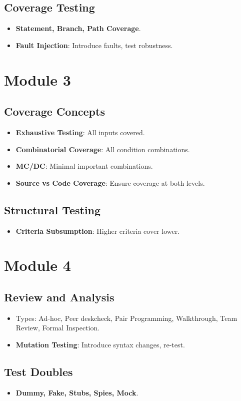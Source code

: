 \documentclass[10pt,portrait]{article}
\begin{document}
\begin{multicols}{ 2 }
\subsection*{Coverage Testing}
\begin{itemize}
    \item \textbf{Statement, Branch, Path Coverage}.
    \item \textbf{Fault Injection}: Introduce faults, test robustness.
\end{itemize}

\section*{Module 3}

\subsection*{Coverage Concepts}
\begin{itemize}
    \item \textbf{Exhaustive Testing}: All inputs covered.
    \item \textbf{Combinatorial Coverage}: All condition combinations.
    \item \textbf{MC/DC}: Minimal important combinations.
    \item \textbf{Source vs Code Coverage}: Ensure coverage at both levels.
\end{itemize}

\subsection*{Structural Testing}
\begin{itemize}
    \item \textbf{Criteria Subsumption}: Higher criteria cover lower.
\end{itemize}

\section*{Module 4}

\subsection*{Review and Analysis}
\begin{itemize}
    \item Types: Ad-hoc, Peer deskcheck, Pair Programming, Walkthrough, Team Review, Formal Inspection.
    \item \textbf{Mutation Testing}: Introduce syntax changes, re-test.
\end{itemize}

\subsection*{Test Doubles}
\begin{itemize}
    \item \textbf{Dummy, Fake, Stubs, Spies, Mock}.
\end{itemize}
\end{multicols}
\end{document}

